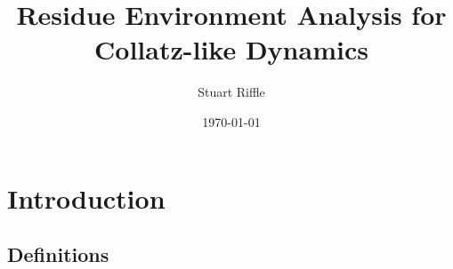 \documentclass[12pt]{article}
\title{Residue Environment Analysis for Collatz-like Dynamics}
\author{Stuart Riffle}
\date{\today}
\theoremstyle{plain}
\theoremstyle{definition}
\begin{document}
\maketitle
\begin{abstract}
\end{abstract}

\section{Introduction}
    \subsection{Definitions}





\newpage


\begin{thebibliography}{9}

\end{thebibliography}
\end{document}
